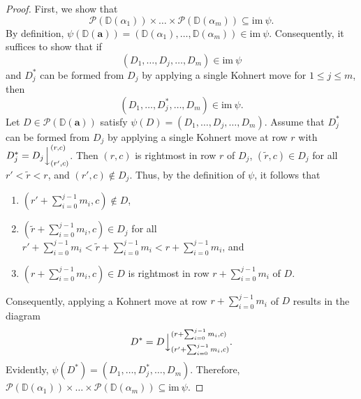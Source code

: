 \documentclass[letterpaper,10pt]{article}
\newcommand{\ldownarrow}{\Big\downarrow}
\begin{document}
\begin{proof}
    First, we show that $$\mathcal{P}(\mathbb{D}(\alpha_1))\times\hdots\times \mathcal{P}(\mathbb{D}(\alpha_m))\subseteq \text{im}~\psi.$$ By definition, $\psi(\mathbb{D}(\mathbf{a}))=(\mathbb{D}(\alpha_1),\hdots,\mathbb{D}(\alpha_m))\in\text{im}~\psi$. Consequently, it suffices to show that if $$(D_1,\hdots, D_j,\hdots,D_m)\in \text{im}~\psi$$ and $D^*_j$ can be formed from $D_j$ by applying a single Kohnert move for $1\le j\le m$, then  $$(D_1,\hdots, D^*_j,\hdots,D_m)\in \text{im}~\psi.$$ Let $D\in \mathcal{P}(\mathbb{D}(\mathbf{a}))$ satisfy $\psi(D)=(D_1,\hdots, D_j,\hdots,D_m)$. Assume that $D_j^*$ can be formed from $D_j$ by applying a single Kohnert move at row $r$ with $D_j^*=D_j\ldownarrow^{(r,c)}_{(r',c)}$. Then $(r,c)$ is rightmost in row $r$ of $D_j$, $(\tilde{r},c)\in D_j$ for all $r'<\tilde{r}< r$, and $(r',c)\notin D_j$. Thus, by the definition of $\psi$, it follows that 
    \begin{enumerate}
        \item $(r'+\sum_{i=0}^{j-1}m_i,c)\notin D$,
        \item $(\tilde{r}+\sum_{i=0}^{j-1}m_i,c)\in D_j$ for all $r'+\sum_{i=0}^{j-1}m_i<\tilde{r}+\sum_{i=0}^{j-1}m_i< r+\sum_{i=0}^{j-1}m_i$, and
        \item  $(r+\sum_{i=0}^{j-1}m_i,c)\in D$ is rightmost in row $r+\sum_{i=0}^{j-1}m_i$ of $D$.
    \end{enumerate}
    Consequently, applying a Kohnert move at row $r+\sum_{i=0}^{j-1}m_i$ of $D$ results in the diagram $$D^*=D\ldownarrow^{(r+\sum_{i=0}^{j-1}m_i,c)}_{(r'+\sum_{i=0}^{j-1}m_i,c)}.$$ Evidently, $\psi(D^*)=(D_1,\hdots, D^*_j,\hdots,D_m)$. Therefore, $\mathcal{P}(\mathbb{D}(\alpha_1))\times\hdots\times \mathcal{P}(\mathbb{D}(\alpha_m))\subseteq \text{im}~\psi.$
    

\end{proof}
\end{document}
